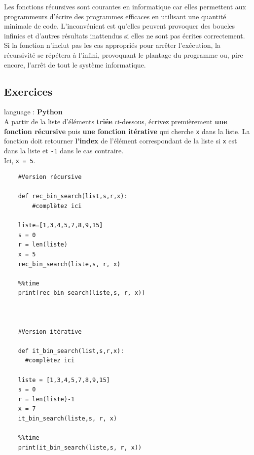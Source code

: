 Les fonctions récursives sont courantes en informatique car elles permettent aux programmeurs d'écrire des programmes efficaces en utilisant une quantité minimale de code. L'inconvénient est qu'elles peuvent provoquer des boucles infinies et d'autres résultats inattendus si elles ne sont pas écrites correctement. Si la fonction n'inclut pas les cas appropriés pour arrêter l'exécution, la récursivité se répétera à l'infini, provoquant le plantage du programme ou, pire encore, l'arrêt de tout le système informatique.\\
   
\subsection{Exercices}

\begin{Exercice}[20 minutes] language : \textbf{Python}\\

A partir de la liste d'éléments \textbf{triée} ci-dessous, écrivez premièrement \textbf{une fonction récursive} puis \textbf{une fonction itérative} qui cherche \lstinline{x} dans la liste. La fonction doit retourner \textbf{l'index} de l'élément correspondant de la liste si \lstinline{x} est dans la liste et \lstinline{-1} dans le cas contraire.\\
Ici, \lstinline{x = 5}.\\

\begin{verbatim}
    #Version récursive
    
    def rec_bin_search(list,s,r,x):
        #complètez ici 
    
    liste=[1,3,4,5,7,8,9,15]
    s = 0
    r = len(liste)
    x = 5
    rec_bin_search(liste,s, r, x)
 
    %%time
    print(rec_bin_search(liste,s, r, x))



    #Version itérative
    
    def it_bin_search(list,s,r,x):
      #complètez ici
      
    liste = [1,3,4,5,7,8,9,15]
    s = 0
    r = len(liste)-1
    x = 7
    it_bin_search(liste,s, r, x)
    
    %%time
    print(it_bin_search(liste,s, r, x))
\end{verbatim}


\end{Exercice}
